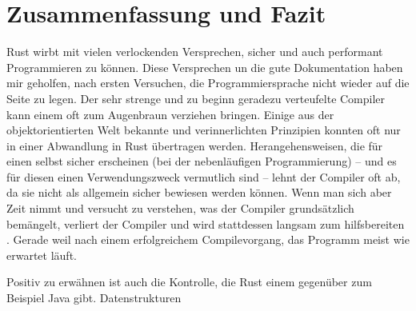 \chapter{Zusammenfassung und Fazit}

Rust wirbt mit vielen verlockenden Versprechen, sicher und auch performant Programmieren zu können.
Diese Versprechen un die gute Dokumentation haben mir geholfen, nach ersten Versuchen, die Programmiersprache nicht wieder auf die Seite zu legen.
Der sehr strenge und zu beginn geradezu verteufelte Compiler kann einem oft zum Augenbraun verziehen bringen.
Einige aus der objektorientierten Welt bekannte und verinnerlichten Prinzipien konnten oft nur in einer Abwandlung in Rust übertragen werden.
Herangehensweisen, die für einen selbst sicher erscheinen (bei der nebenläufigen Programmierung)  -- und es für diesen einen Verwendungszweck vermutlich sind -- lehnt der Compiler oft ab, da sie nicht als allgemein sicher bewiesen werden können.
Wenn man sich aber Zeit nimmt und versucht zu verstehen, was der Compiler grundsätzlich bemängelt, verliert der Compiler  und wird stattdessen langsam zum hilfsbereiten .
Gerade weil nach einem erfolgreichem Compilevorgang, das Programm meist wie erwartet läuft.

Positiv zu erwähnen ist auch die Kontrolle, die Rust einem gegenüber zum Beispiel Java gibt.
Datenstrukturen






